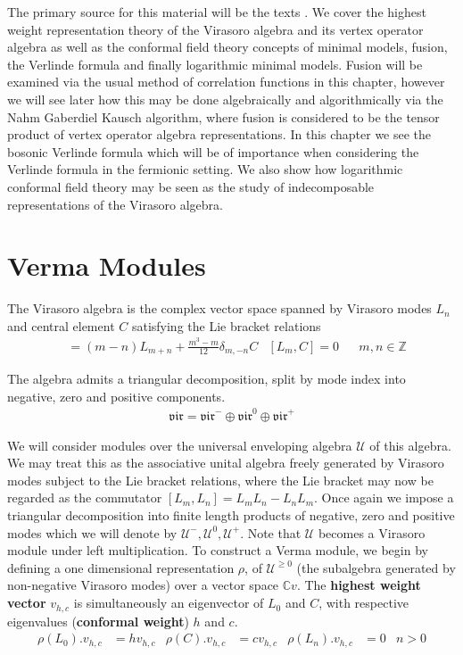 \documentclass[a4paper,reqno,12pt]{report}
\theoremstyle{definition}
\newcommand{\Z}{\mathbb{Z}}
\newcommand{\C}{\mathbb{C}}
\numberwithin{equation}{section}
\renewcommand{\ge}{\geqslant}
\theoremstyle{plain}
\begin{document}
The primary source for this material will be the texts \cite{MatCFT97, FrenkVert01}. We cover the highest weight representation theory of the Virasoro algebra and its vertex operator algebra as well as the conformal field theory concepts of minimal models, fusion, the Verlinde formula and finally logarithmic minimal models. Fusion will be examined via the usual method of correlation functions in this chapter, however we will see later how this may be done algebraically and algorithmically via the Nahm Gaberdiel Kausch algorithm, where fusion is considered to be the tensor product of vertex operator algebra representations. In this chapter we see the bosonic Verlinde formula which will be of importance when considering the Verlinde formula in the fermionic setting. We also show how logarithmic conformal field theory may be seen as the study of indecomposable representations of the Virasoro algebra.




\section{Verma Modules}

The Virasoro algebra is the complex vector space spanned by Virasoro modes $L_n$ and central element $C$ satisfying the Lie bracket relations
\begin{align*}
[L_m, L_n] &= (m-n) L_{m+n} + \frac{m^3 - m}{12} \delta_{m,-n}C & [L_m, C] = 0&& m,n\in \Z
\end{align*}

The algebra admits a triangular decomposition, split by mode index into negative, zero and positive components.
\begin{align*}
\mathfrak{vir} = \mathfrak{vir}^- \oplus \mathfrak{vir}^0 \oplus \mathfrak{vir}^+
\end{align*}

We will consider modules over the universal enveloping algebra $\mathcal{U}$ of this algebra. We may treat this as the associative unital algebra freely generated by Virasoro modes subject to the Lie bracket relations, where the Lie bracket may now be regarded as the commutator $[L_m,L_n] = L_mL_n - L_nL_m$. Once again we impose a triangular decomposition into finite length products of negative, zero and positive modes which we will denote by $\mathcal{U}^-, \mathcal{U}^0, \mathcal{U}^+$. Note that $\mathcal{U}$ becomes a Virasoro module under left multiplication. 
To construct a Verma module, we begin by defining a one dimensional representation $\rho$, of $\mathcal{U}^{\ge 0}$ (the subalgebra generated by non-negative Virasoro modes) over a vector space $\C v$. The {\bf highest weight vector} $v_{h,c}$ is simultaneously an eigenvector of $L_0$ and $C$, with respective eigenvalues ({\bf conformal weight}) $h$ and $c$.
\begin{align}
\rho(L_0) .v_{h,c} & = hv_{h,c}&\rho(C).v_{h,c} &= cv_{h,c}&\rho(L_n).v_{h,c} &= 0&n>0 \label{eqn:hwv}
\end{align}
\end{document}
